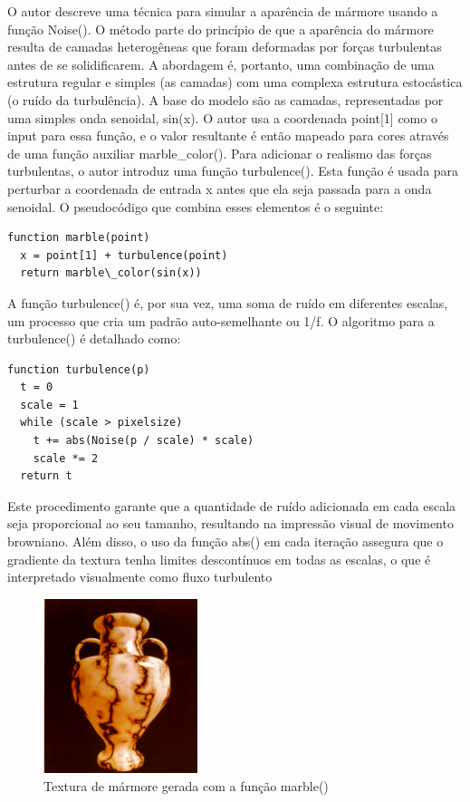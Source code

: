O autor descreve uma técnica para simular a aparência de mármore usando a função Noise(). O método parte do princípio de que a aparência do mármore resulta de camadas heterogêneas que foram deformadas por forças turbulentas antes de se solidificarem. A abordagem é, portanto, uma combinação de uma estrutura regular e simples (as camadas) com uma complexa estrutura estocástica (o ruído da turbulência). A base do modelo são as camadas, representadas por uma simples onda senoidal, sin(x). O autor usa a coordenada point[1] como o input para essa função, e o valor resultante é então mapeado para cores através de uma função auxiliar marble\_color(). Para adicionar o realismo das forças turbulentas, o autor introduz uma função turbulence(). Esta função é usada para perturbar a coordenada de entrada x antes que ela seja passada para a onda senoidal. O pseudocódigo que combina esses elementos é o seguinte:

\begin{verbatim}
function marble(point)
  x = point[1] + turbulence(point)
  return marble\_color(sin(x))
\end{verbatim}

A função turbulence() é, por sua vez, uma soma de ruído em diferentes escalas, um processo que cria um padrão auto-semelhante ou 1/f. O algoritmo para a turbulence() é detalhado como:

\begin{verbatim}
function turbulence(p)
  t = 0
  scale = 1
  while (scale > pixelsize)
    t += abs(Noise(p / scale) * scale)
    scale *= 2
  return t
\end{verbatim}

Este procedimento garante que a quantidade de ruído adicionada em cada escala seja proporcional ao seu tamanho, resultando na impressão visual de movimento browniano. Além disso, o uso da função abs() em cada iteração assegura que o gradiente da textura tenha limites descontínuos em todas as escalas, o que é interpretado visualmente como fluxo turbulento

\begin{figure}[H]
    \centering
    \includegraphics[width=0.4\textwidth]{img/marble.png}
    \caption{Textura de mármore gerada com a função marble()}
    \label{fig:marble_texture}
\end{figure}

